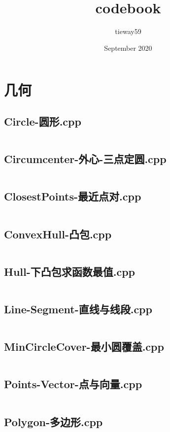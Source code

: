 \documentclass[a4paper,landscape,twocolumn]{article} %
\title{codebook}
\author{tieway59}
\date{September 2020}
\begin{document}

\begingroup
\let\onecolumn\twocolumn
\tableofcontents
\endgroup

\newpage

\section{几何}
\subsection{Circle-圆形.cpp}
\inputminted{c++}{./codes/000}
\subsection{Circumcenter-外心-三点定圆.cpp}
\inputminted{c++}{./codes/001}
\subsection{ClosestPoints-最近点对.cpp}
\inputminted{c++}{./codes/002}
\subsection{ConvexHull-凸包.cpp}
\inputminted{c++}{./codes/003}
\subsection{Hull-下凸包求函数最值.cpp}
\inputminted{c++}{./codes/004}
\subsection{Line-Segment-直线与线段.cpp}
\inputminted{c++}{./codes/005}
\subsection{MinCircleCover-最小圆覆盖.cpp}
\inputminted{c++}{./codes/006}
\subsection{Points-Vector-点与向量.cpp}
\inputminted{c++}{./codes/007}
\subsection{Polygon-多边形.cpp}
\inputminted{c++}{./codes/008}
\end{document}
